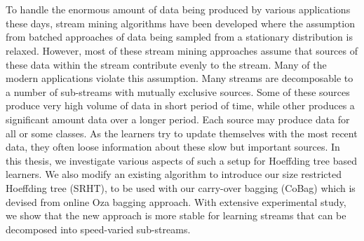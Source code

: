 \chapter{\abstractname}
To handle the enormous amount of data being produced by various applications these days, stream mining algorithms have been developed where the assumption from batched approaches of data being sampled from a stationary distribution is relaxed.
However, most of these stream mining approaches assume that sources of these data within the stream contribute evenly to the stream.
Many of the modern applications violate this assumption. Many streams are decomposable to a number of sub-streams with mutually exclusive sources. Some of these sources produce very high volume of data in short period of time, while other produces a significant amount data over a longer period. Each source may produce data for all or some classes.
As the learners try to update themselves with the most recent data, they often loose information about these slow but important sources.
In this thesis, we investigate various aspects of such a setup for Hoeffding tree based learners. We also modify an existing algorithm to introduce our size restricted Hoeffding tree (SRHT), to be used with our carry-over bagging (CoBag) which is devised from online Oza bagging approach. With extensive experimental study, we show that the new approach is more stable for learning streams that can be decomposed into speed-varied sub-streams.

